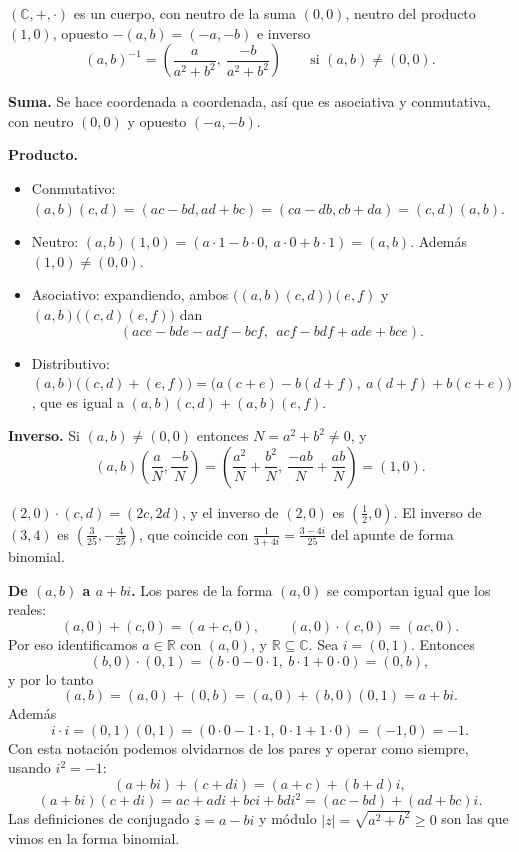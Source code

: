 \begin{proposicion}
$(\mathbb{C},+,\cdot)$ es un cuerpo, con neutro de la suma $(0,0)$, neutro del
producto $(1,0)$, opuesto $-(a,b)=(-a,-b)$ e inverso
\[
(a,b)^{-1}=\left(\frac{a}{a^2+b^2},\ \frac{-b}{a^2+b^2}\right) \qquad\text{si }(a,b)\neq(0,0).
\]
\end{proposicion}

\begin{demostracion}
\textbf{Suma.} Se hace coordenada a coordenada, así que es asociativa y conmutativa,
con neutro $(0,0)$ y opuesto $(-a,-b)$.

\textbf{Producto.}
\begin{itemize}
    \item Conmutativo: $(a,b)(c,d)=(ac-bd,ad+bc)=(ca-db,cb+da)=(c,d)(a,b)$.
    \item Neutro: $(a,b)(1,0)=(a\cdot 1-b\cdot 0,\ a\cdot 0+b\cdot 1)=(a,b)$. Además
    $(1,0)\neq(0,0)$.
    \item Asociativo: expandiendo, ambos $\big((a,b)(c,d)\big)(e,f)$ y
    $(a,b)\big((c,d)(e,f)\big)$ dan
    \[
    (ace-bde-adf-bcf,\ \ acf-bdf+ade+bce).
    \]
    \item Distributivo:
    $(a,b)\big((c,d)+(e,f)\big)=\big(a(c+e)-b(d+f),\ a(d+f)+b(c+e)\big)$, que es igual a
    $(a,b)(c,d)+(a,b)(e,f)$.
\end{itemize}

\textbf{Inverso.} Si $(a,b)\neq(0,0)$ entonces $N=a^2+b^2\neq 0$, y
\[
(a,b)\left(\frac{a}{N},\frac{-b}{N}\right)=\left(\frac{a^2}{N}+\frac{b^2}{N},\ \frac{-ab}{N}+\frac{ab}{N}\right)=(1,0).
\]
\end{demostracion}

\begin{ejemplo}
$(2,0)\cdot(c,d)=(2c,2d)$, y el inverso de $(2,0)$ es $(\tfrac12,0)$. El inverso de
$(3,4)$ es $\left(\tfrac{3}{25},-\tfrac{4}{25}\right)$, que coincide con
$\tfrac{1}{3+4i}=\tfrac{3-4i}{25}$ del apunte de forma binomial.
\end{ejemplo}

\begin{nota}
\textbf{De $(a,b)$ a $a+bi$.} Los pares de la forma $(a,0)$ se comportan igual que
los reales:
\[
(a,0)+(c,0)=(a+c,0), \qquad (a,0)\cdot(c,0)=(ac,0).
\]
Por eso identificamos $a\in\mathbb{R}$ con $(a,0)$, y $\mathbb{R}\subseteq\mathbb{C}$.
Sea $i=(0,1)$. Entonces
\[
(b,0)\cdot(0,1)=(b\cdot 0-0\cdot 1,\ b\cdot 1+0\cdot 0)=(0,b),
\]
y por lo tanto
\[
(a,b)=(a,0)+(0,b)=(a,0)+(b,0)(0,1)=a+bi.
\]
Además
\[
i\cdot i=(0,1)(0,1)=(0\cdot 0-1\cdot 1,\ 0\cdot 1+1\cdot 0)=(-1,0)=-1.
\]
Con esta notación podemos olvidarnos de los pares y operar como siempre, usando
$i^2=-1$:
\[
(a+bi)+(c+di)=(a+c)+(b+d)i,
\]
\[
(a+bi)(c+di)=ac+adi+bci+bdi^2=(ac-bd)+(ad+bc)i.
\]
Las definiciones de conjugado $\overline{z}=a-bi$ y módulo
$|z|=\sqrt{a^2+b^2}\ge 0$ son las que vimos en la forma binomial.
\end{nota}

